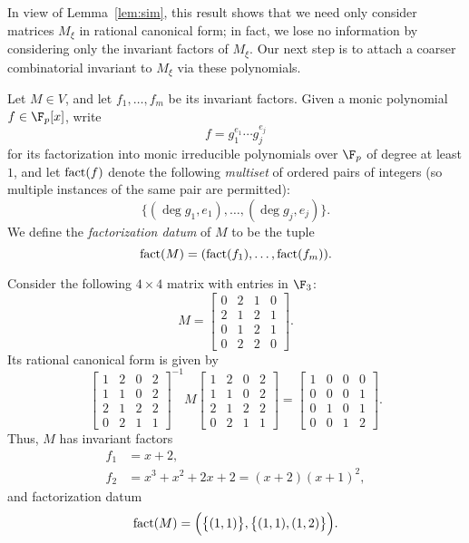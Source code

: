 In view of Lemma~\ref{lem:sim}, this result shows that we need only consider matrices $M_\xi$ in rational canonical form; in fact, we lose no information by considering only the invariant factors of $M_\xi$. Our next step is to attach a coarser combinatorial invariant to $M_\xi$ via these polynomials.
\begin{defn}
Let $M\in V$, and let $f_1,\ldots,f_m$ be its invariant factors. Given a monic polynomial $f\in\F_p[x]$, write
\begin{equation*}
f=g_1^{e_1}\cdots g_j^{e_j}
\end{equation*}
for its factorization into monic irreducible polynomials over $\F_p$ of degree at least $1$, and let $\operatorname{fact}(f)$ denote the following \emph{multiset} of ordered pairs of integers (so multiple instances of the same pair are permitted):
\begin{equation*}
\big\{(\deg g_1,e_1),\ldots,(\deg g_j,e_j)\big\}.
\end{equation*}
We define the \emph{factorization datum} of $M$ to be the tuple
\begin{equation*}
\operatorname{fact}(M)=(\operatorname{fact}(f_1),\ldots,\operatorname{fact}(f_m)).
\end{equation*}
\end{defn}
\begin{example}
\label{ex:fact}
Consider the following $4\times 4$ matrix with entries in $\F_3$:
\begin{equation*}
M=\begin{bmatrix}
0&2&1&0\\
2&1&2&1\\
0&1&2&1\\
0&2&2&0
\end{bmatrix}.
\end{equation*}
Its rational canonical form is given by
\begin{equation*}
\begin{bmatrix}
1&2&0&2\\
1&1&0&2\\
2&1&2&2\\
0&2&1&1
\end{bmatrix}^{-1}
M
\begin{bmatrix}
1&2&0&2\\
1&1&0&2\\
2&1&2&2\\
0&2&1&1
\end{bmatrix}
=
\begin{bmatrix}
1&0&0&0\\
0&0&0&1\\
0&1&0&1\\
0&0&1&2
\end{bmatrix}.
\end{equation*}
Thus, $M$ has invariant factors
\begin{align*}
f_1&=x+2,\\
f_2&=x^3+x^2+2x+2=(x+2)(x+1)^2,
\end{align*}
and factorization datum
\begin{equation}
\label{eqn:factM}
\operatorname{fact}(M)=\Big(\big\{(1,1)\big\},\big\{(1,1),(1,2)\big\}\Big).
\end{equation}
\end{example}
